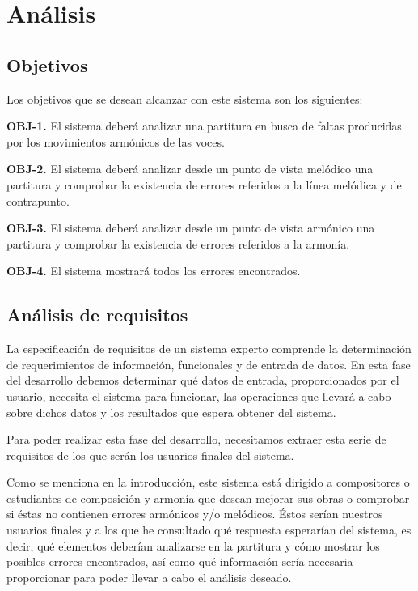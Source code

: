 \chapter{Análisis}

\section{Objetivos}

Los objetivos que se desean alcanzar con este sistema son los siguientes:

\bigskip
\textbf{OBJ-1.} El sistema deberá analizar una partitura en busca de faltas producidas por los movimientos armónicos de las voces.

\textbf{OBJ-2.} El sistema deberá analizar desde un punto de vista melódico una partitura y comprobar la existencia de errores referidos a la línea melódica y de contrapunto.

\textbf{OBJ-3.} El sistema deberá analizar desde un punto de vista armónico una partitura y comprobar la existencia de errores referidos a la armonía.

\textbf{OBJ-4.} El sistema mostrará todos los errores encontrados. 

\section{Análisis de requisitos}

La especificación de requisitos de un sistema experto comprende la determinación de requerimientos de información, funcionales y de entrada de datos. En esta fase del desarrollo debemos determinar qué datos de entrada, proporcionados por el usuario, necesita el sistema para funcionar, las operaciones que llevará a cabo sobre dichos datos y los resultados que espera obtener del sistema.  

Para poder realizar esta fase del desarrollo, necesitamos extraer esta serie de requisitos de los que serán los usuarios finales del sistema.

Como se menciona en la introducción, este sistema está dirigido a compositores o estudiantes de composición y armonía que desean mejorar sus obras o comprobar si éstas no contienen errores armónicos y/o melódicos. Éstos serían nuestros usuarios finales y a los que he consultado qué respuesta esperarían del sistema, es decir, qué elementos deberían analizarse en la partitura y cómo mostrar los posibles errores encontrados, así como qué información sería necesaria proporcionar para poder llevar a cabo el análisis deseado. 

